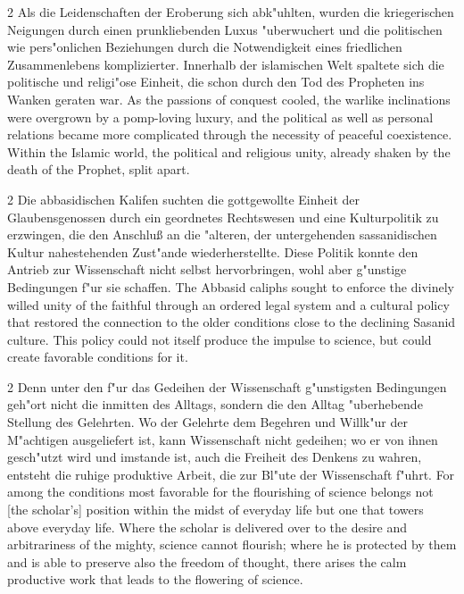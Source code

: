 \documentclass[10pt,a4paper]{article}
\renewcommand{\switchcolumn}{\syncronize\nointerlineskip\columnbreak}
\begin{document}
\begin{paracol}{2}
Als die Leidenschaften der Eroberung sich abk"uhlten, wurden die kriegerischen Neigungen durch einen prunkliebenden Luxus "uberwuchert und die politischen wie pers"onlichen Beziehungen durch die Notwendigkeit eines friedlichen Zusammenlebens komplizierter. Innerhalb der islamischen Welt spaltete sich die politische und religi"ose Einheit, die schon durch den Tod des Propheten ins Wanken geraten war.
\switchcolumn
As the passions of conquest cooled, the warlike inclinations were overgrown by a pomp-loving luxury, and the political as well as personal relations became more complicated through the necessity of peaceful coexistence. Within the Islamic world, the political and religious unity, already shaken by the death of the Prophet, split apart.
\end{paracol}

\begin{paracol}{2}
Die abbasidischen Kalifen suchten die gottgewollte Einheit der Glaubensgenossen durch ein geordnetes Rechtswesen und eine Kulturpolitik zu erzwingen, die den Anschlu\ss{} an die "alteren, der untergehenden sassanidischen Kultur nahestehenden Zust"ande wiederherstellte. Diese Politik konnte den Antrieb zur Wissenschaft nicht selbst hervorbringen, wohl aber g"unstige Bedingungen f"ur sie schaffen.
\switchcolumn
The Abbasid caliphs sought to enforce the divinely willed unity of the faithful through an ordered legal system and a cultural policy that restored the connection to the older conditions close to the declining Sasanid culture. This policy could not itself produce the impulse to science, but could create favorable conditions for it.
\end{paracol}

\begin{paracol}{2}
Denn unter den f"ur das Gedeihen der Wissenschaft g"unstigsten Bedingungen geh"ort nicht die inmitten des Alltags, sondern die den Alltag "uberhebende Stellung des Gelehrten. Wo der Gelehrte dem Begehren und Willk"ur der M"achtigen ausgeliefert ist, kann Wissenschaft nicht gedeihen; wo er von ihnen gesch"utzt wird und imstande ist, auch die Freiheit des Denkens zu wahren, entsteht die ruhige produktive Arbeit, die zur Bl"ute der Wissenschaft f"uhrt.
\switchcolumn
For among the conditions most favorable for the flourishing of science belongs not [the scholar's] position within the midst of everyday life but one that towers above everyday life. Where the scholar is delivered over to the desire and arbitrariness of the mighty, science cannot flourish; where he is protected by them and is able to preserve also the freedom of thought, there arises the calm productive work that leads to the flowering of science.
\end{paracol}
\end{document}
